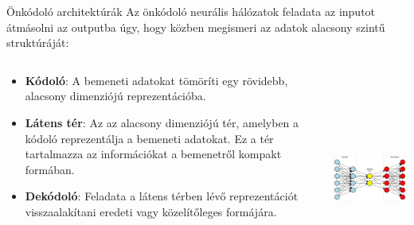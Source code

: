 \documentclass[english, aspectratio=169]{beamer}
\begin{document}
\begin{frame}{Önkódoló architektúrák}
Az önkódoló neurális hálózatok feladata az inputot átmásolni az outputba úgy, hogy közben megismeri az adatok alacsony szintű struktúráját:
\begin{columns}
\begin{column}{.5\textwidth}
\begin{itemize}
	\item \textbf{Kódoló}: A bemeneti adatokat tömöríti egy rövidebb, alacsony dimenziójú reprezentációba.
	\item \textbf{Látens tér}: Az az alacsony dimenziójú tér, amelyben a kódoló reprezentálja a bemeneti adatokat. Ez a tér tartalmazza az információkat a bemenetről kompakt formában.
	\item \textbf{Dekódoló}: Feladata a látens térben lévő reprezentációt visszaalakítani eredeti vagy közelítőleges formájára.
\end{itemize}
\end{column}
\begin{column}{.5\textwidth}
\begin{center}
\includegraphics[height=7cm, width=7cm, keepaspectratio]{../../7_dl/doc/graphs/dl_4.png}
\end{center}
\end{column}
\end{columns}
\end{frame}
\end{document}
